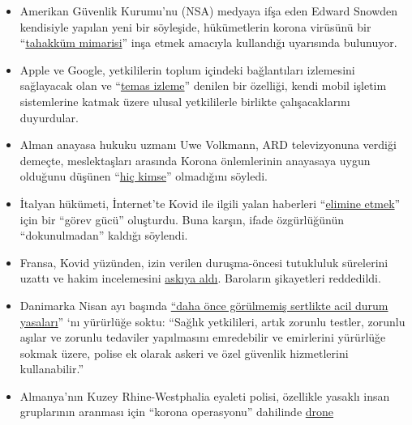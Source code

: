 \begin{itemize}
\tightlist
\item
  Amerikan Güvenlik Kurumu'nu (NSA) medyaya ifşa eden Edward Snowden
  kendisiyle yapılan yeni bir söyleşide, hükümetlerin korona virüsünü
  bir
  ``\href{https://www.vice.com/en_us/article/bvge5q/snowden-warns-governments-are-using-coronavirus-to-build-the-architecture-of-oppression}{tahakküm
  mimarisi}'' inşa etmek amacıyla kullandığı uyarısında bulunuyor.
\item
  Apple ve Google, yetkililerin toplum içindeki bağlantıları izlemesini
  sağlayacak olan ve
  ``\href{https://www.bloomberg.com/news/articles/2020-04-10/apple-google-bring-covid-19-contact-tracing-to-3-billion-people}{temas
  izleme}'' denilen bir özelliği, kendi mobil işletim sistemlerine
  katmak üzere ulusal yetkililerle birlikte çalışacaklarını duyurdular.
\item
  Alman anayasa hukuku uzmanı Uwe Volkmann, ARD televizyonuna verdiği
  demeçte, meslektaşları arasında Korona önlemlerinin anayasaya uygun
  olduğunu düşünen
  ``\href{https://www.youtube.com/watch?v=DvzrGLvzllU}{hiç kimse}''
  olmadığını söyledi.
\item
  İtalyan hükümeti, İnternet'te Kovid ile ilgili yalan haberleri
  ``\href{https://www.faz.net/aktuell/feuilleton/medien/corona-in-italien-das-virus-und-die-wahrheit-16714529.html}{elimine
  etmek}'' için bir ``görev gücü'' oluşturdu. Buna karşın, ifade
  özgürlüğünün ``dokunulmadan'' kaldığı söylendi.
\item
  Fransa, Kovid yüzünden, izin verilen duruşma-öncesi tutukluluk
  sürelerini uzattı ve hakim incelemesini
  \href{https://www.lefigaro.fr/politique/coronavirus-le-conseil-d-etat-sur-la-ligne-de-crete-des-libertes-publiques-20200406}{askıya
  aldı}. Baroların şikayetleri reddedildi.
\item
  Danimarka Nisan ayı başında
  \href{https://www.fr.de/politik/coronavirus-sars-cov-2-daenemark-notfalls-militaer-13598503.html}{``daha
  önce görülmemiş sertlikte acil durum yasaları}'' `nı yürürlüğe soktu:
  ``Sağlık yetkilileri, artık zorunlu testler, zorunlu aşılar ve zorunlu
  tedaviler yapılmasını emredebilir ve emirlerini yürürlüğe sokmak
  üzere, polise ek olarak askeri ve özel güvenlik hizmetlerini
  kullanabilir.''
\item
  Almanya'nın Kuzey Rhine-Westphalia eyaleti polisi, özellikle yasaklı
  insan gruplarının aranması için ``korona operasyonu'' dahilinde
  \href{https://rp-online.de/nrw/panorama/nrw-polizei-testet-drohnen-bei-einsaetzen-wegen-corona-massnahmen_aid-50006143}{drone
}
\end{itemize}
